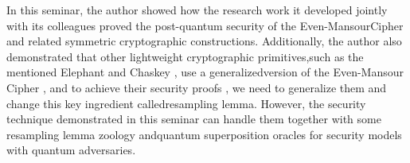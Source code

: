 \documentclass[12pt]{article}
\begin{document}
    In this seminar, the author showed how the research work it developed jointly with its colleagues proved the post-quantum security of the Even-Mansour\break Cipher and related symmetric cryptographic constructions. Additionally, the author also demonstrated that other lightweight cryptographic primitives,\break such as the mentioned Elephant \cite{beyne-chen-dobraunig-mennink:dumbo-jumbo-delirium-parallel-authenticated-encryption-lightweight-circus:2020:03-2024} and Chaskey \cite{mouha-et-al:chaskey-efficient-mac-algorithm-32-bit-microcontrollers:2014:03-2024}, use a generalized\break version of the Even-Mansour Cipher \cite{even-mansour:construction-cipher-single-pseudorandom-permutation:1997:03-2024,dunkelman-keller-shamir:minimalism-cryptography-even-mansour-scheme-revisited:2012:03-2024}, and to achieve their security proofs \cite{alagic-bai-katz-majenz:post-quantum-security-even-mansour-cipher:2021:03-2024,alagic-et-al:post-quantum-security-tweakable-even-mansour-applications:2022:03-2024}, we need to generalize them and change this key ingredient called\break resampling lemma. However, the security technique demonstrated in this seminar can handle them together with some resampling lemma zoology and\break quantum superposition oracles for security models with quantum adversaries.
    
    
    

    \clearpage
    
    
    \label{bib:bibliography}
    
\end{document}
